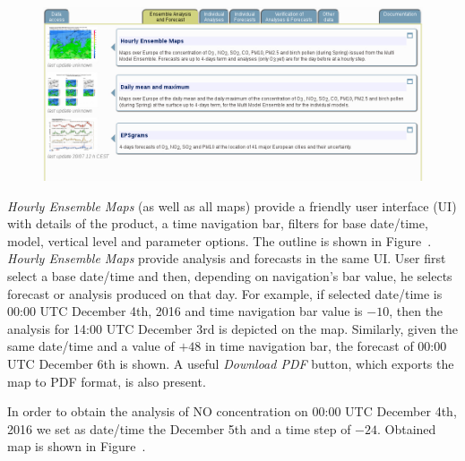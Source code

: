 \documentclass[9pt]{report}
\begin{document}
\begin{figure}[h!]%
\begin{mdcenter}%

\noindent{}\includegraphics[keepaspectratio=true,width=\dimmin{}{\dimwidth{0.90}}]{images/ensemble_tab}{}%

\mdhr{}%

\noindent{}%
\end{mdcenter}\label{ensemble-tab}%
\end{figure}%

\noindent{}\emph{Hourly Ensemble Maps} (as well as all maps) provide a friendly user interface (UI) with details of the product, a time navigation bar, filters for base date/time, model, vertical level and parameter options.
The outline is shown in Figure~.
\emph{Hourly Ensemble Maps} provide analysis and forecasts in the same UI. User first select a base date/time and then, depending on navigation's bar value, he selects forecast or analysis produced on that day.
For example, if selected date/time is 00:00 UTC December 4th, 2016 and time navigation bar value is $-10$, then the analysis for 14:00 UTC December 3rd is depicted on the map.
Similarly, given the same date/time and a value of $+48$ in time navigation bar, the forecast of 00:00 UTC December 6th is shown. 
A useful \emph{Download PDF} button, which exports the map to PDF format, is also present.%

In order to obtain the analysis of NO concentration on 00:00 UTC December 4th, 2016 we set as date/time the December 5th and a time step of $-24$. 
Obtained map is shown in Figure~.%
\end{document}
